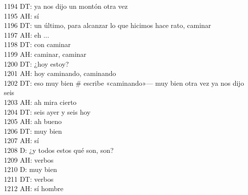 1194 DT: ya nos dijo un montón otra vez\\
1195 AH: sí\\
1196 DT: un último, para alcanzar lo que hicimos hace rato, caminar\\
1197 AH: eh ...\\
1198 DT: con caminar\\
1199 AH: caminar, caminar\\
1200 DT: ¿hoy estoy?\\
1201 AH: hoy caminando, caminando\\
1202 DT: eso muy bien \# escribe «caminando»--- muy bien otra vez ya nos dijo seis\\
1203 AH: ah mira cierto\\
1204 DT: seis ayer y seis hoy\\
1205 AH: ah bueno\\
1206 DT: muy bien\\
1207 AH: sí\\
1208 D: ¿y todos estos qué son, son?\\
1209 AH: verbos\\
1210 D: muy bien\\
1211 DT: verbos\\
1212 AH: sí hombre\\
